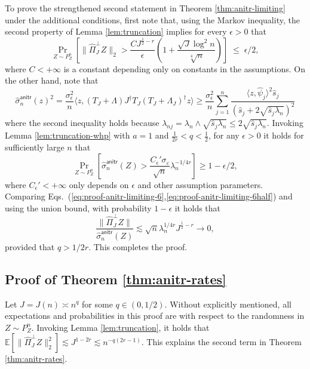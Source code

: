 \documentclass[11pt,a4paper]{article}
\renewcommand{\hat}{\widehat}
\theoremstyle{definition}
\theoremstyle{plain}
\theoremstyle{remark}
\newcommand{\anitr}{\mathsf{anitr}}
\begin{document}
To prove the strengthened second statement in Theorem \ref{thm:anitr-limiting} under the additional conditions, first note that, using the Markov inequality, the second property of Lemma \ref{lem:truncation} implies
for every $\epsilon>0$ that 
\begin{equation}
\Pr_{Z\sim P_Z^n}\left[\|\hat\Pi_J^\perp Z\|_2 > \frac{CJ^{\frac{1}{2}-r}}{\epsilon}\left(1+\frac{\sqrt{J}\log^2 n}{\sqrt[4]{n}}\right)\right] \;\leq\; \epsilon/2,
\label{eq:proof-anitr-limiting-6}
\end{equation}
where $C<+\infty$ is a constant depending only on constants in the assumptions.
On the other hand, note that 
$$
\hat\sigma_n^\anitr(z)^2 = \frac{\sigma_\epsilon^2}{n}\langle z,(T_J+\Lambda)J^\dagger T_J(T_J+\Lambda_J)^\dagger z\rangle \geq \frac{\sigma_\epsilon^2}{n}\sum_{j=1}^n\frac{\langle z,\hat\psi_j\rangle^2\hat s_j}{(\hat s_j+2\sqrt{\hat s_j\lambda_n})^2}
$$
where the second inequality holds because $\lambda_{nj}=\lambda_n\wedge\sqrt{\hat s_j\lambda_n}\leq 2\sqrt{\hat s_j\lambda_n}$.
Invoking Lemma \ref{lem:truncation-whp} with $a=1$ and $\frac{1}{2r}<q<\frac{1}{2}$, for any $\epsilon>0$ it holds for sufficiently large $n$ that
\begin{equation}
\Pr_{Z\sim P_Z^n}\left[\hat\sigma_n^\anitr(Z) > \frac{C_\epsilon'\sigma_\varepsilon}{\sqrt{n}}\lambda_n^{-1/4r}\right]\geq 1-\epsilon/2,
\label{eq:proof-anitr-limiting-6half}
\end{equation}
where $C_\epsilon'<+\infty$ only depends on $\epsilon$ and other assumption parameters.
Comparing Eqs.~(\ref{eq:proof-anitr-limiting-6},\ref{eq:proof-anitr-limiting-6half}) and using the union bound, with probability $1-\epsilon$ it holds that
$$
\frac{\|\hat\Pi_J^\perp Z\|}{\hat\sigma_n^\anitr(Z)} \lesssim \sqrt{n}\lambda_n^{1/4r} J^{\frac{1}{2}-r} \to 0, 
$$
provided that $q>1/2r$. This completes the proof.


\subsection{Proof of Theorem \ref{thm:anitr-rates}}
Let $J=J(n)\asymp n^q$ for some $q\in(0,1/2)$.
Without explicitly mentioned, all expectations and probabilities in this proof are with respect to the randomness in $Z\sim P_Z^n$.
Invoking Lemma \ref{lem:truncation}, it holds that $\mathbb E[\|\hat\Pi_J^\perp Z\|_2^2]\lesssim J^{1-2r} \lesssim n^{-q(2r-1)}$. This explains the second term in Theorem \ref{thm:anitr-rates}.
\end{document}
